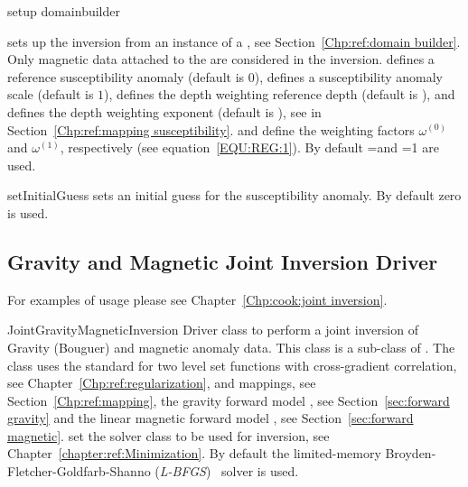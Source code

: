 \begin{methoddesc}[MagneticInversion]{setup}{
domainbuilder
}

sets up the inversion from an instance  of a , see Section~\ref{Chp:ref:domain builder}.
Only magnetic data attached to the  are considered in the inversion.
 defines a reference susceptibility anomaly (default is $0$), 
 defines a susceptibility anomaly scale (default is $1$),
 defines the depth weighting reference depth (default is \None), and
 defines the depth weighting exponent (default is \None),
see  in Section~\ref{Chp:ref:mapping susceptibility}.
 and  define the weighting factors
$\omega^{(0)}$ and
$\omega^{(1)}$, respectively (see equation~\ref{EQU:REG:1}).
By default =\None and =1 are used.
\end{methoddesc}

\begin{methoddesc}[MagneticInversion]{setInitialGuess}{}
sets an initial guess for the susceptibility anomaly. By default zero is used.
\end{methoddesc}

\subsection{Gravity and Magnetic Joint Inversion Driver}
For examples of usage please see Chapter~\ref{Chp:cook:joint inversion}.

\begin{classdesc}{JointGravityMagneticInversion}{}
Driver class to perform a joint inversion of Gravity (Bouguer) and magnetic anomaly data.
This class is a sub-class of . 
The class uses the standard  for two level set functions
with cross-gradient correlation, see Chapter~\ref{Chp:ref:regularization},
 and  mappings, see Section~\ref{Chp:ref:mapping}, the 
gravity forward model , see Section~\ref{sec:forward gravity}
and the linear
magnetic forward model , see Section~\ref{sec:forward magnetic}.
 set the solver class to be used for inversion,
see Chapter~\ref{chapter:ref:Minimization}.
 By default the limited-memory Broyden-Fletcher-Goldfarb-Shanno (\emph{L-BFGS})~\cite{Nocedal1980} solver is used.
\end{classdesc}


